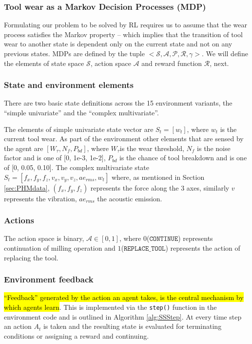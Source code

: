 \documentclass[a4paper, 12pt]{article}
\newcommand{\hlc}[2][cyan!7]{{\colorlet{foo}{#1} \sethlcolor{foo}\hl{#2}}}
\begin{document}
\subsubsection*{Tool wear as a Markov Decision Processes (MDP)}
Formulating our problem to be solved by RL requires us to assume that the wear process satisfies the Markov property -- which implies that the transition of tool wear to another state is dependent only on the current state and not on any previous states. MDPs are defined by the tuple $<\mathcal{S, A, P, R, \gamma}>$. We will define the elements of state space $\mathcal{S}$, action space $\mathcal{A}$ and reward function $\mathcal{R}$, next.

\subsubsection*{State and environment elements}
There are two basic state definitions across the 15 environment variants, the ``simple univariate'' and the ``complex multivariate''. 

The elements of simple univariate state vector are $S_t = [w_t]$, where $w_t$ is the current tool wear. As part of the environment other elements that are sensed by the agent are $[W_\tau, N_f, P_{bd}]$, where $W_\tau$is the wear threshold, $N_f$ is the noise factor and is one of [0, 1e-3, 1e-2], $P_{bd}$ is the chance of tool breakdown and is one of [0, 0.05, 0.10]. The complex multivariate state $S_t = [f_x, f_y, f_z, v_x, v_y, v_z, ae_{rms}, w_t]$ where, as mentioned in Section \ref{sec:PHMdata}, $(f_x, f_y, f_z)$ represents the force along the 3 axes, similarly $v$ represents the vibration, $ae_{rms}$ the acoustic emission.

\subsubsection*{Actions}
The action space is binary, $\mathcal{A} \in [0, 1]$, where $0$($\texttt{CONTINUE}$) represents continuation of milling operation and $1$($\texttt{REPLACE\_TOOL}$) represents the action of replacing the tool.

\subsubsection*{Environment feedback}
\hlc{``Feedback'' generated by the action an agent takes, is the central mechanism by which agents learn}. This is implemented via the \texttt{step()} function in the environment code and is outlined in Algorithm \ref{alg:SSStep}. At every time step an action $A_t$ is taken and the resulting state is evaluated for terminating conditions or assigning a reward and continuing.
\end{document}
